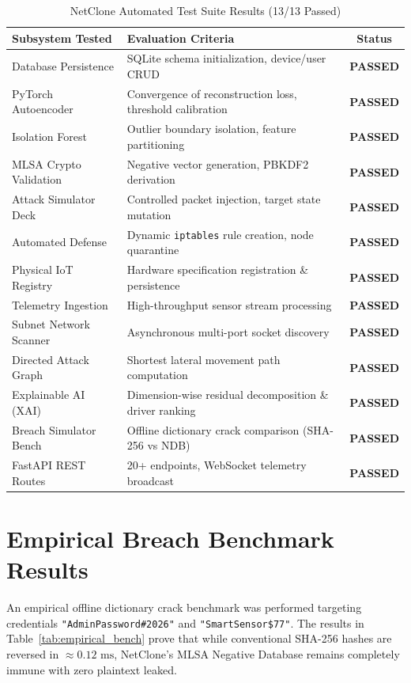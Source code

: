 \documentclass[12pt,a4paper]{report}
\begin{document}
\begin{table}[htbp]
\centering
\caption{NetClone Automated Test Suite Results (13/13 Passed)}
\label{tab:test_results}
\begin{tabular}{llc}
\toprule
\textbf{Subsystem Tested} & \textbf{Evaluation Criteria} & \textbf{Status} \\
\midrule
Database Persistence & SQLite schema initialization, device/user CRUD & \textbf{PASSED} \\
PyTorch Autoencoder & Convergence of reconstruction loss, threshold calibration & \textbf{PASSED} \\
Isolation Forest & Outlier boundary isolation, feature partitioning & \textbf{PASSED} \\
MLSA Crypto Validation & Negative vector generation, PBKDF2 derivation & \textbf{PASSED} \\
Attack Simulator Deck & Controlled packet injection, target state mutation & \textbf{PASSED} \\
Automated Defense & Dynamic \texttt{iptables} rule creation, node quarantine & \textbf{PASSED} \\
Physical IoT Registry & Hardware specification registration \& persistence & \textbf{PASSED} \\
Telemetry Ingestion & High-throughput sensor stream processing & \textbf{PASSED} \\
Subnet Network Scanner & Asynchronous multi-port socket discovery & \textbf{PASSED} \\
Directed Attack Graph & Shortest lateral movement path computation & \textbf{PASSED} \\
Explainable AI (XAI) & Dimension-wise residual decomposition \& driver ranking & \textbf{PASSED} \\
Breach Simulator Bench & Offline dictionary crack comparison (SHA-256 vs NDB) & \textbf{PASSED} \\
FastAPI REST Routes & 20+ endpoints, WebSocket telemetry broadcast & \textbf{PASSED} \\
\bottomrule
\end{tabular}
\end{table}

\section{Empirical Breach Benchmark Results}
An empirical offline dictionary crack benchmark was performed targeting credentials \texttt{"AdminPassword\#2026"} and \texttt{"SmartSensor\$77"}. The results in Table~\ref{tab:empirical_bench} prove that while conventional SHA-256 hashes are reversed in $\approx 0.12\text{ ms}$, NetClone's MLSA Negative Database remains completely immune with zero plaintext leaked.
\end{document}
